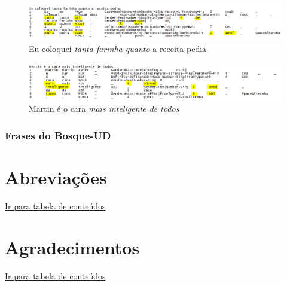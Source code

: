 \documentclass[output=paper,colorlinks,citecolor=brown]{langscibook}
\begin{document}
\begin{figure}
    \centering
    \includegraphics[width=\textwidth,height=\textheight,keepaspectratio]{imagesDrive/image20.png}
    \caption{Eu coloquei \emph{tanta farinha quanto} a receita pedia}
    \label{fig:comparative1}
    \end{figure}{}

\begin{figure}
    \centering
    \includegraphics[width=\textwidth,height=\textheight,keepaspectratio]{imagesDrive/image27.png}
    \caption{Martin é o cara \emph{mais inteligente de todos}}
    \label{fig:comparative2}
\end{figure}{}

\subsection{Frases do Bosque-UD}



\chapter*{Abreviações}

\hyperlink{toc}{Ir para tabela de conteúdos\\}



\chapter*{Agradecimentos}

\hyperlink{toc}{Ir para tabela de conteúdos\\}



\printbibliography[heading=subbibliography,notkeyword=this]
\end{document}
